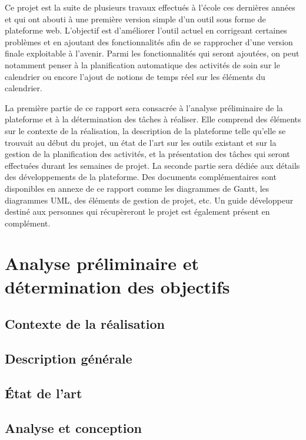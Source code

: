 \documentclass{polytech/polytech}
\begin{document}
Ce projet est la suite de plusieurs travaux effectués à l'école ces dernières années et qui ont abouti à une première version simple d'un outil sous forme de plateforme web. L'objectif est d'améliorer l'outil actuel en corrigeant certaines problèmes et en ajoutant des fonctionnalités afin de se rapprocher d'une version finale exploitable à l'avenir. Parmi les fonctionnalités qui seront ajoutées, on peut notamment penser à la planification automatique des activités de soin sur le calendrier ou encore l'ajout de notions de temps réel sur les éléments du calendrier.

La première partie de ce rapport sera consacrée à l'analyse préliminaire de la plateforme et à la détermination des tâches à réaliser. Elle comprend des éléments sur le contexte de la réalisation, la description de la plateforme telle qu'elle se trouvait au début du projet, un état de l'art sur les outils existant et sur la gestion de la planification des activités, et la présentation des tâches qui seront effectuées durant les semaines de projet. La seconde partie sera dédiée aux détails des développements de la plateforme. Des documents complémentaires sont disponibles en annexe de ce rapport comme les diagrammes de Gantt, les diagrammes UML, des éléments de gestion de projet, etc. Un guide développeur destiné aux personnes qui récupèreront le projet est également présent en complément.


\part{Analyse préliminaire et détermination des objectifs}


\chapter{Contexte de la réalisation}


\chapter{Description générale}


\chapter{État de l'art}


\chapter{Analyse et conception}
\end{document}
